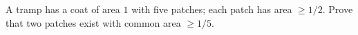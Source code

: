 A tramp has a coat of area $1$ with five patches; each patch has area $\geq 1/2$. Prove that two patches exist with common area $\geq 1/5$.
